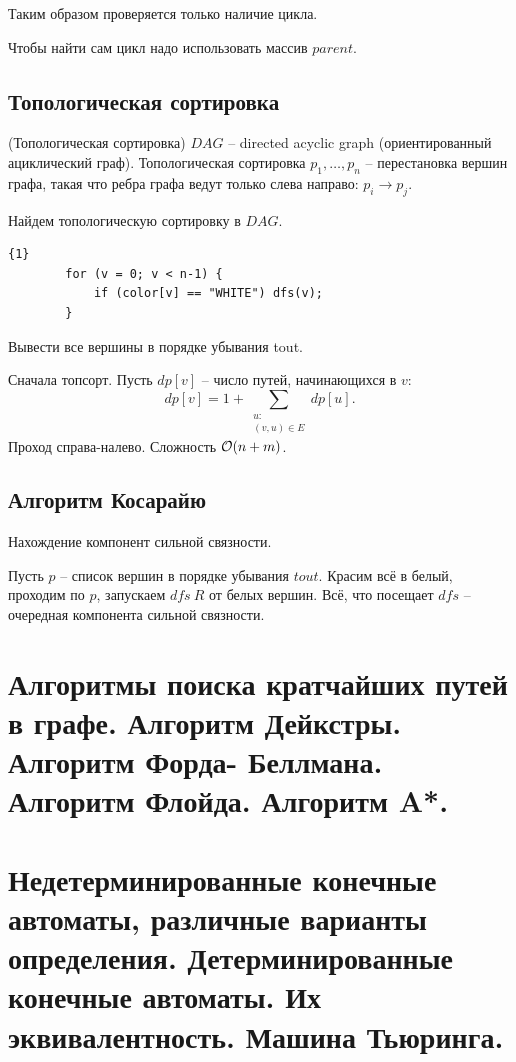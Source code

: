 \begin{multicols}{2}
    \begin{note}{}{}
        Таким образом проверяется только наличие цикла.
    \end{note}
    \begin{note}{}{}
        Чтобы найти сам цикл надо использовать массив $parent$.
    \end{note}
    \subsection*{Топологическая сортировка}
    \begin{definition}{(Топологическая сортировка)}{}
        $DAG$ -- directed acyclic graph (ориентированный ациклический граф). Топологическая сортировка $p_1, \ldots, p_n$ -- перестановка вершин графа, такая что ребра графа ведут только слева направо: $p_i \to p_j$.
    \end{definition}
    Найдем топологическую сортировку в $DAG$.
    \begin{lstlisting}{1}
        for (v = 0; v < n-1) {
            if (color[v] == "WHITE") dfs(v);
        }
    \end{lstlisting}
    Вывести все вершины в порядке убывания tout.
    \par
    Сначала топсорт. Пусть $dp[v]$ -- число путей, начинающихся в $v$:
    \[
        dp[v] = 1 + \sum\limits_{\substack{u:\\(v,u)\in E}} dp[u]. 
    \]
    Проход справа-налево. Сложность ${\cal O}(n + m)$.
    \subsection*{Алгоритм Косарайю}
    Нахождение компонент сильной связности.
    \par
    Пусть $p$ -- список вершин в порядке убывания $tout$. Красим всё в белый, проходим по $p$, запускаем $dfs\ R$ от белых вершин. Всё, что посещает $dfs$ -- очередная компонента сильной связности.
    \section{Алгоритмы поиска кратчайших путей в графе. Алгоритм Дейкстры. Алгоритм Форда-
    Беллмана. Алгоритм Флойда. Алгоритм A*.}
    \columnbreak
    \section{Недетерминированные конечные автоматы, различные варианты определения.
    Детерминированные конечные автоматы. Их эквивалентность. Машина Тьюринга.}
\end{multicols}